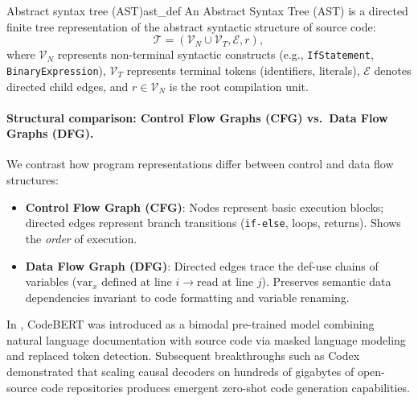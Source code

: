 \documentclass[../../main.tex]{subfiles}
\begin{document}
\begin{definition}{Abstract syntax tree (AST)}{ast_def}
An Abstract Syntax Tree (AST) is a directed finite tree representation of the abstract syntactic structure of source code:
\begin{equation}
\mathcal{T} = (\mathcal{V}_N \cup \mathcal{V}_T, \mathcal{E}, r),
\end{equation}
where $\mathcal{V}_N$ represents non-terminal syntactic constructs (e.g., \texttt{IfStatement}, \texttt{BinaryExpression}), $\mathcal{V}_T$ represents terminal tokens (identifiers, literals), $\mathcal{E}$ denotes directed child edges, and $r \in \mathcal{V}_N$ is the root compilation unit.
\end{definition}

\paragraph{Structural comparison: Control Flow Graphs (CFG) vs.~Data Flow Graphs (DFG).}
We contrast how program representations differ between control and data flow structures:
\begin{itemize}
    \item \textbf{Control Flow Graph (CFG)}: Nodes represent basic execution blocks; directed edges represent branch transitions (\texttt{if-else}, loops, returns). Shows the \emph{order} of execution.
    \item \textbf{Data Flow Graph (DFG)}: Directed edges trace the def-use chains of variables ($\text{var}_x \text{ defined at line } i \to \text{read at line } j$). Preserves semantic data dependencies invariant to code formatting and variable renaming.
\end{itemize}


\begin{deepdive}
In \citep{feng2020codebert}, CodeBERT was introduced as a bimodal pre-trained model combining natural language documentation with source code via masked language modeling and replaced token detection. Subsequent breakthroughs such as Codex \citep{chen2021codex} demonstrated that scaling causal decoders on hundreds of gigabytes of open-source code repositories produces emergent zero-shot code generation capabilities.
\end{deepdive}
\end{document}
